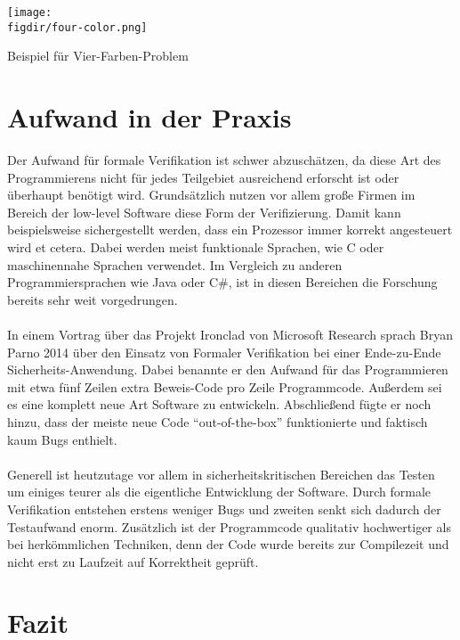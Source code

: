 \begin{minipage}{\textwidth}
	\centering
	\captionsetup{type=figure}
	\texttt{[image: \\figdir/four-color.png]}
	\caption{Beispiel für Vier-Farben-Problem}
	\label{fig:four-color}
\end{minipage}

\section{Aufwand in der Praxis}
Der Aufwand für formale Verifikation ist schwer abzuschätzen, da diese Art des Programmierens nicht für jedes Teilgebiet ausreichend erforscht ist oder überhaupt benötigt wird. Grundsätzlich nutzen vor allem große Firmen im Bereich der low-level Software diese Form der Verifizierung. Damit kann beispielsweise sichergestellt werden, dass ein Prozessor immer korrekt angesteuert wird et cetera. Dabei werden meist funktionale Sprachen, wie C oder maschinennahe Sprachen verwendet. Im
Vergleich zu anderen Programmiersprachen wie Java oder C\#, ist in diesen Bereichen die Forschung bereits sehr weit vorgedrungen.\\
\\
In einem Vortrag über das Projekt Ironclad von Microsoft Research sprach Bryan Parno 2014 über den Einsatz von Formaler Verifikation bei einer Ende-zu-Ende Sicherheits-Anwendung. Dabei benannte er den Aufwand für das Programmieren mit etwa fünf Zeilen extra Beweis-Code pro Zeile Programmcode. Außerdem sei es eine komplett neue Art Software zu entwickeln. Abschließend fügte er noch hinzu, dass der meiste neue Code "`out-of-the-box"' funktionierte und faktisch kaum Bugs enthielt.\cite{IRONCLAD01:FV}\\
\\
Generell ist heutzutage vor allem in sicherheitskritischen Bereichen das Testen um einiges teurer als die eigentliche Entwicklung der Software. Durch formale Verifikation entstehen erstens weniger Bugs und zweiten senkt sich dadurch der Testaufwand enorm. Zusätzlich ist der Programmcode qualitativ hochwertiger als bei herkömmlichen Techniken, denn der Code wurde bereits zur Compilezeit und nicht erst zu Laufzeit auf Korrektheit geprüft.

\section{Fazit}

